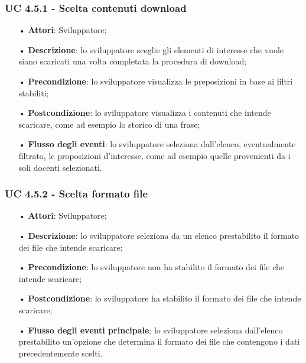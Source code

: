 \subsubsection{UC 4.5.1 - Scelta contenuti download}
\begin{itemize}
	\item[•]\textbf{Attori}: Sviluppatore;
	\item[•]\textbf{Descrizione}: lo sviluppatore sceglie gli elementi di interesse che vuole siano scaricati una volta completata la procedura di download;
	\item[•]\textbf{Precondizione}: lo sviluppatore visualizza le preposizioni in base ai filtri stabiliti;
	\item[•]\textbf{Postcondizione}: lo sviluppatore visualizza i contenuti che intende scaricare, come ad esempio lo storico di una frase;
	\item[•]\textbf{Flusso degli eventi}: lo sviluppatore seleziona dall'elenco, eventualmente filtrato, le proposizioni d'interesse, come ad esempio quelle provenienti da i soli docenti selezionati.
\end{itemize}

\subsubsection{UC 4.5.2 - Scelta formato file}
\begin{itemize}
	\item[•]\textbf{Attori}: Sviluppatore;
	\item[•]\textbf{Descrizione}:  lo sviluppatore seleziona da un elenco prestabilito il formato dei file che intende scaricare;
	\item[•]\textbf{Precondizione}: lo sviluppatore non ha stabilito il formato dei file che intende scaricare;
	\item[•]\textbf{Postcondizione}: lo sviluppatore ha stabilito il formato dei file che intende scaricare;
	\item[•]\textbf{Flusso degli eventi principale}:  lo sviluppatore seleziona dall'elenco prestabilito un'opzione che determina il formato dei file che contengono i dati precedentemente scelti.
\end{itemize}

